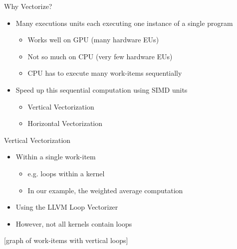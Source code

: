 
\begin{frame}{Why Vectorize?}

\begin{itemize}
    \item Many executions units each executing one instance of a single program 
    \begin{itemize}
        \item Works well on GPU (many hardware EUs)
        \item Not so much on CPU (very few hardware EUs)
        \item CPU has to execute many work-items sequentially
    \end{itemize}
    \item Speed up this sequential computation using SIMD units
    \begin{itemize}
        \item Vertical Vectorization
        \item Horizontal Vectorization
    \end{itemize}
\end{itemize}

\end{frame}


\begin{frame}{Vertical Vectorization}

\begin{itemize}
    \item Within a single work-item
    \begin{itemize}
        \item e.g. loops within a kernel
        \item In our example, the weighted average computation
        \end{itemize}
    \item Using the LLVM Loop Vectorizer
    \item However, not all kernels contain loops
\end{itemize}

[graph of work-items with vertical loops]

\end{frame}


